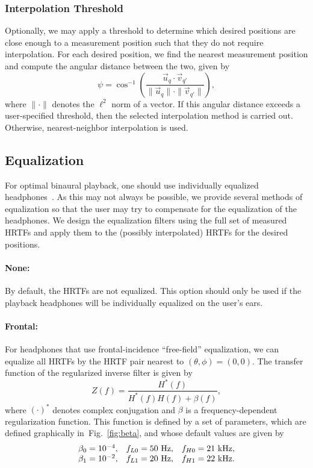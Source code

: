 \documentclass[11pt, oneside]{article}
\newcommand{\figref}[1]{Fig.~\ref{#1}}
\begin{document}
\subsubsection{Interpolation Threshold}
Optionally, we may apply a threshold to determine which desired positions are close enough to a measurement position such that they do not require interpolation.
For each desired position, we find the nearest measurement position and compute the angular distance between the two, given by
\begin{equation}
\psi = \cos^{-1} \left( \frac{\vec{u}_q \cdot \vec{v}_{q'}}{\|\vec{u}_q\| \cdot \|\vec{v}_{q'}\|} \right),
\end{equation}
where $\| \cdot \|$ denotes the $\ell^2$ norm of a vector.
If this angular distance exceeds a user-specified threshold, then the selected interpolation method is carried out.
Otherwise, nearest-neighbor interpolation is used.

\subsection{Equalization}
For optimal binaural playback, one should use individually equalized headphones~\citep{ScharerLindau2009}.
As this may not always be possible, we provide several methods of equalization
so that the user may try to compensate for the equalization of the headphones.
We design the equalization filters using the full set of measured HRTFs
and apply them to the (possibly interpolated) HRTFs for the desired positions.

\paragraph{None:} By default, the HRTFs are not equalized.
This option should only be used if the playback headphones will be individually equalized on the user's ears.

\paragraph{Frontal:} For headphones that use frontal-incidence ``free-field'' equalization,
we can equalize all HRTFs by the HRTF pair nearest to $(\theta,\phi) = (0,0)$.
The transfer function of the regularized inverse filter is given by~\citep{Farina2007a}
\begin{equation}\label{eq:EQ_Filter}
Z(f) = \frac{H^\ast(f)}{H^\ast(f) H(f) + \beta(f)},
\end{equation}
where $(\cdot)^\ast$ denotes complex conjugation and $\beta$ is a frequency-dependent regularization function.
This function is defined by a set of parameters, which are defined graphically in~\figref{fig:beta}, and whose default values are given by
\begin{equation*}
\begin{array}{l l l}
\beta_0 = 10^{-4}, &f_{L0} = 50~\text{Hz}, &f_{H0} = 21~\text{kHz}, \\
\beta_1 = 10^{-2}, &f_{L1} = 20~\text{Hz}, &f_{H1} = 22~\text{kHz}.
\end{array}
\end{equation*}
\end{document}
